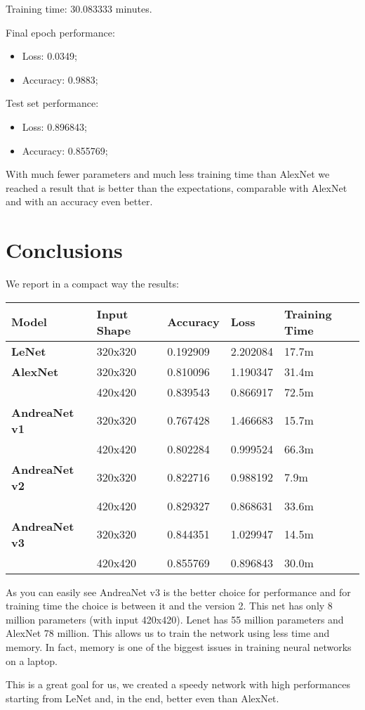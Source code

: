 \documentclass[paper=a4, fontsize=11pt]{scrartcl} %
\numberwithin{equation}{section} %
\numberwithin{figure}{section} %
\numberwithin{table}{section} %
\begin{document}
Training time: 30.083333 minutes.

Final epoch performance:
\begin{itemize}
    \item Loss: 0.0349;
    \item Accuracy: 0.9883;
\end{itemize}

Test set performance:
\begin{itemize}
    \item Loss: 0.896843;
    \item Accuracy: 0.855769;
\end{itemize}

With much fewer parameters and much less training time than AlexNet we reached a result that is better than the expectations, comparable with AlexNet and with an accuracy even better.

\section*{Conclusions}

We report in a compact way the results:

\bigskip
\begin{tabular}{ | l | l | l | l | l | }
    \hline
    \textbf{Model} & \textbf{Input Shape} & \textbf{Accuracy} & \textbf{Loss} & \textbf{Training Time} \\ \hline
    \textbf{LeNet}        & 320x320 & 0.192909 & 2.202084 & 17.7m \\ \hline
    \textbf{AlexNet}      & 320x320 & 0.810096 & 1.190347 & 31.4m \\
                          & 420x420 & 0.839543 & 0.866917 & 72.5m \\ \hline
    \textbf{AndreaNet v1} & 320x320 & 0.767428 & 1.466683 & 15.7m \\
                          & 420x420 & 0.802284 & 0.999524 & 66.3m \\ \hline
    \textbf{AndreaNet v2} & 320x320 & 0.822716 & 0.988192 & 7.9m \\
                          & 420x420 & 0.829327 & 0.868631 & 33.6m\\ \hline
    \textbf{AndreaNet v3} & 320x320 & 0.844351 & 1.029947 & 14.5m \\
                          & 420x420 & 0.855769 & 0.896843 & 30.0m\\ \hline
\end{tabular}
\bigskip

As you can easily see AndreaNet v3 is the better choice for performance and for training time the choice is between it and the version 2.
This net has only 8 million parameters (with input 420x420). Lenet has 55 million parameters and AlexNet 78 million.
This allows us to train the network using less time and memory. In fact, memory is one of the biggest issues in training neural networks on a laptop.

This is a great goal for us, we created a speedy network with high performances starting from LeNet and, in the end, better even than AlexNet.

% 
%
\end{document}
